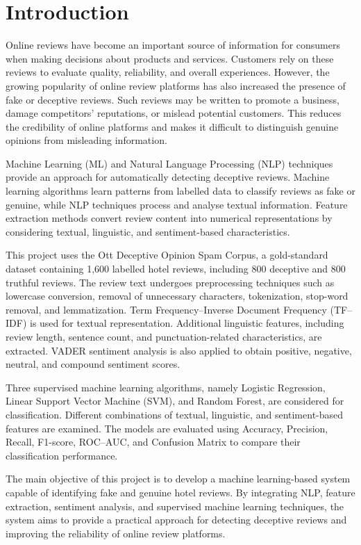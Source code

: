 \documentclass[12pt,a4paper]{report}
\begin{document}
\chapter{Introduction}

Online reviews have become an important source of information
for consumers when making decisions about products and services.
Customers rely on these reviews to evaluate quality, reliability,
and overall experiences. However, the growing popularity of
online review platforms has also increased the presence of
fake or deceptive reviews. Such reviews may be written to
promote a business, damage competitors' reputations, or
mislead potential customers. This reduces the credibility
of online platforms and makes it difficult to distinguish
genuine opinions from misleading information.

Machine Learning (ML) and Natural Language Processing (NLP)
techniques provide an approach for automatically detecting
deceptive reviews. Machine learning algorithms learn patterns
from labelled data to classify reviews as fake or genuine,
while NLP techniques process and analyse textual information.
Feature extraction methods convert review content into
numerical representations by considering textual, linguistic,
and sentiment-based characteristics.

This project uses the Ott Deceptive Opinion Spam Corpus,
a gold-standard dataset containing 1,600 labelled hotel
reviews, including 800 deceptive and 800 truthful reviews.
The review text undergoes preprocessing techniques such as
lowercase conversion, removal of unnecessary characters,
tokenization, stop-word removal, and lemmatization.
Term Frequency--Inverse Document Frequency (TF--IDF)
is used for textual representation. Additional linguistic
features, including review length, sentence count, and
punctuation-related characteristics, are extracted.
VADER sentiment analysis is also applied to obtain
positive, negative, neutral, and compound sentiment scores.

Three supervised machine learning algorithms, namely
Logistic Regression, Linear Support Vector Machine (SVM),
and Random Forest, are considered for classification.
Different combinations of textual, linguistic, and
sentiment-based features are examined. The models are
evaluated using Accuracy, Precision, Recall, F1-score,
ROC--AUC, and Confusion Matrix to compare their
classification performance.

The main objective of this project is to develop a
machine learning-based system capable of identifying
fake and genuine hotel reviews. By integrating NLP,
feature extraction, sentiment analysis, and supervised
machine learning techniques, the system aims to provide
a practical approach for detecting deceptive reviews
and improving the reliability of online review platforms.
\end{document}
